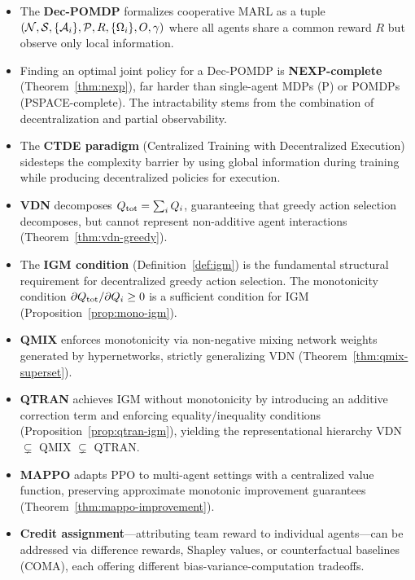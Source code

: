 \documentclass[11pt,a4paper]{article}
\begin{document}
\begin{itemize}
  \item The \textbf{Dec-POMDP} formalizes cooperative MARL as a
    tuple $(\mathcal{N}, \mathcal{S}, \{\mathcal{A}_i\}, \mathcal{P}, R,
    \{\Omega_i\}, O, \gamma)$ where all agents share a common
    reward $R$ but observe only local information.

  \item Finding an optimal joint policy for a Dec-POMDP is
    \textbf{NEXP-complete} (Theorem~\ref{thm:nexp}), far harder
    than single-agent MDPs (P) or POMDPs (PSPACE-complete).  The
    intractability stems from the combination of decentralization
    and partial observability.

  \item The \textbf{CTDE paradigm} (Centralized Training with
    Decentralized Execution) sidesteps the complexity barrier by
    using global information during training while producing
    decentralized policies for execution.

  \item \textbf{VDN} decomposes $Q_{\mathrm{tot}} = \sum_i Q_i$, guaranteeing
    that greedy action selection decomposes, but cannot represent
    non-additive agent interactions (Theorem~\ref{thm:vdn-greedy}).

  \item The \textbf{IGM condition} (Definition~\ref{def:igm})
    is the fundamental structural requirement for decentralized
    greedy action selection.  The monotonicity condition
    $\partial Q_{\mathrm{tot}} / \partial Q_i \geq 0$ is a sufficient
    condition for IGM (Proposition~\ref{prop:mono-igm}).

  \item \textbf{QMIX} enforces monotonicity via non-negative
    mixing network weights generated by hypernetworks, strictly
    generalizing VDN (Theorem~\ref{thm:qmix-superset}).

  \item \textbf{QTRAN} achieves IGM without monotonicity by
    introducing an additive correction term and enforcing
    equality/inequality conditions
    (Proposition~\ref{prop:qtran-igm}), yielding the
    representational hierarchy VDN $\subsetneq$ QMIX $\subsetneq$
    QTRAN.

  \item \textbf{MAPPO} adapts PPO to multi-agent settings with
    a centralized value function, preserving approximate monotonic
    improvement guarantees (Theorem~\ref{thm:mappo-improvement}).

  \item \textbf{Credit assignment}---attributing team reward to
    individual agents---can be addressed via difference rewards,
    Shapley values, or counterfactual baselines (COMA), each
    offering different bias-variance-computation tradeoffs.
\end{itemize}
\end{document}

